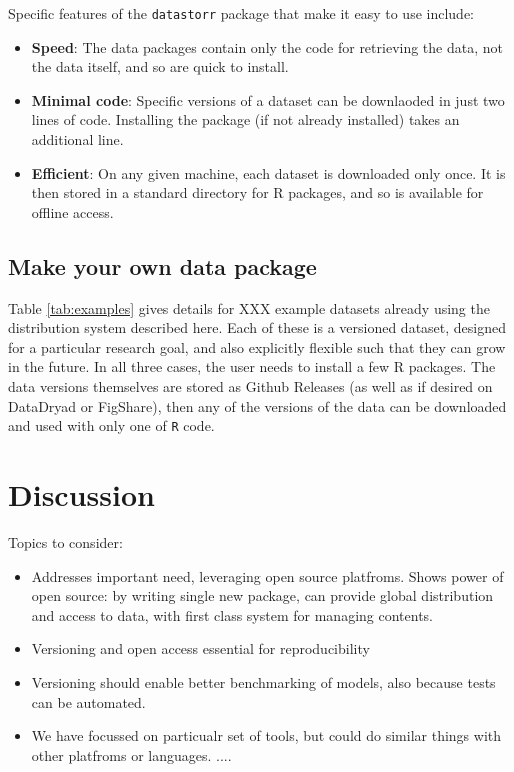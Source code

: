 \documentclass[a4paper,11pt]{article}
\begin{document}
Specific features of the \texttt{datastorr} package that make it easy to use include:

\begin{itemize}
  \item \textbf{Speed}: The data packages contain only the code for retrieving the data, not the data itself, and so are quick to install.
  \item \textbf{Minimal code}: Specific versions of a dataset can be downlaoded in just two lines of code. Installing the package (if not already installed) takes an additional line.
  \item \textbf{Efficient}: On any given machine, each dataset is downloaded only once. It is then stored in a standard directory for R packages, and so is available for offline access.
\end{itemize}

\subsection{Make your own data package}

Table \ref{tab:examples} gives details for XXX example datasets already using
the distribution system described here. Each of these is a versioned dataset,
designed for a particular research goal, and also explicitly flexible such
that they can grow in the future. In all three cases, the user needs to
install a few R packages. The data versions themselves are stored as Github
Releases (as well as if desired on DataDryad or FigShare), then any of the
versions of the data can be downloaded and used with only one of \texttt{R}
code.

\section{Discussion}

Topics to consider:

\begin{itemize}

\item Addresses important need, leveraging open source platfroms. Shows power of open source: by writing single new package, can provide global distribution and access to data, with first class system for managing contents.
\item Versioning and open access essential for reproducibility
\item Versioning should enable better benchmarking of models, also because tests can be automated.
\item We have focussed on particualr set of tools, but could do similar things with other platfroms or languages.
....
\end{itemize}
\end{document}
